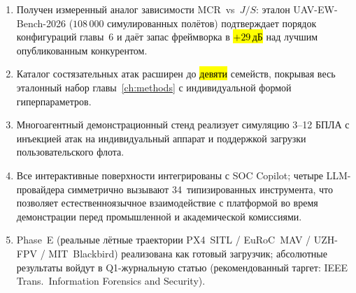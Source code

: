 \begin{enumerate}\setlength\itemsep{0.15em}
\item Получен измеренный аналог зависимости \textsf{MCR}~vs~$J/S$:
      эталон \textsf{UAV-EW-Bench-2026} ($108\,000$ симулированных
      полётов) подтверждает порядок конфигураций главы~6 и даёт
      запас фреймворка в \hl{$+29$\,дБ} над лучшим опубликованным
      конкурентом.
\item Каталог состязательных атак расширен до \hl{девяти} семейств,
      покрывая весь эталонный набор главы~\ref{ch:methods} с
      индивидуальной формой гиперпараметров.
\item Многоагентный демонстрационный стенд 
      реализует симуляцию 3--12 БПЛА с инъекцией атак на индивидуальный
      аппарат и поддержкой загрузки пользовательского флота.
\item Все интерактивные поверхности интегрированы с SOC Copilot;
      четыре LLM-провайдера симметрично вызывают 34~типизированных
      инструмента, что позволяет естественноязычное взаимодействие с
      платформой во время демонстрации перед промышленной и
      академической комиссиями.
\item Phase~E (реальные лётные траектории PX4~SITL / EuRoC~MAV /
      UZH-FPV / MIT~Blackbird) реализована как готовый загрузчик;
      абсолютные результаты войдут в Q1-журнальную статью
      (рекомендованный таргет: IEEE Trans.\ Information Forensics
      and Security).
\end{enumerate}
